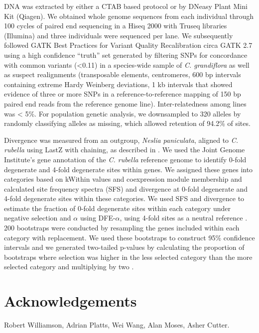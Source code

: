 DNA was extracted by either a CTAB based protocol or by DNeasy Plant Mini Kit (Qiagen). We obtained whole genome sequences from each individual through 100 cycles of paired end sequencing in a Hiseq 2000 with Truseq libraries (Illumina) and three individuals were sequenced per lane. We subsequently followed GATK Best Practices for Variant Quality Recalibration circa GATK 2.7 \citep{DePristo2011-jc} using a high confidence “truth” set generated by filtering SNPs for concordance with common variants (\textless0.11) in a species-wide sample of \textit{C. grandiflora} as well as suspect realignments (transposable elements, centromeres, 600 bp intervals containing extreme Hardy Weinberg deviations, 1 kb intervals that showed evidence of three or more SNPs in a reference-to-reference mapping of 150 bp paired end reads from the reference genome line). Inter-relatedness among lines was < 5\%. For population genetic analysis, we downsampled to 320 alleles by randomly classifying alleles as missing, which allowed retention of 94.2\% of sites.

Divergence was measured from an outgroup, \textit{Neslia paniculata}, aligned to \textit{C. rubella} using LastZ with chaining, as described in \citep{Haudry2013-qe}. We used the Joint Genome Institute’s gene annotation of the \textit{C. rubella} reference genome to identify 0-fold degenerate and 4-fold degenerate sites within genes. We assigned these genes into categories based on kWithin values and coexpression module membership and calculated site frequency spectra (SFS) and divergence at 0-fold degenerate and 4-fold degenerate sites within these categories.  We used SFS and divergence to estimate the fraction of 0-fold degenerate sites within each category under negative selection and $\alpha$ using DFE-$\alpha$, using 4-fold sites as a neutral reference \citep{Eyre-Walker2009-zt,keightley2007}. 200 bootstraps were conducted by resampling the genes included within each category with replacement. We used these bootstraps to construct 95\% confidence intervals and we generated two-tailed p-values by calculating the proportion of bootstraps where selection was higher in the less selected category than the more selected category and multiplying by two \citep{Eyre-Walker2009-zt}. 



\section{Acknowledgements}
Robert Williamson, Adrian Platts, Wei Wang, Alan Moses, Asher Cutter.

